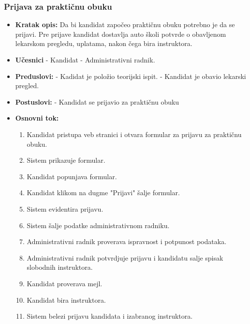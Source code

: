 \subsubsection{Prijava za praktičnu obuku}

\vspace{3mm}

\begin{itemize}

\item \textbf{Kratak opis:} Da bi kandidat započeo praktičnu obuku potrebno je da se prijavi. Pre prijave kandidat dostavlja auto školi potvrde o obavljenom lekarskom pregledu, uplatama, nakon čega bira instruktora.

\vspace{2mm}

\item \textbf{Učesnici} \newline
   - Kandidat \newline 
   - Administrativni radnik.

\item \textbf{Preduslovi:} \newline
   - Kadidat je položio teorijski ispit. \newline 
   - Kandidat je obavio lekarski pregled. 

\item \textbf{Postuslovi:} \newline
    - Kandidat se prijavio za praktičnu obuku 

\item \textbf{Osnovni tok:}  
   \begin{enumerate}
   \item Kandidat pristupa veb stranici i otvara formular za prijavu za praktičnu obuku.
   \item Sistem prikazuje formular.
   \item Kandidat popunjava formular.
   \item Kandidat klikom na dugme "Prijavi" šalje formular.
   \item Sistem evidentira prijavu.
   \item Sistem šalje podatke administrativnom radniku.
   \item Administrativni radnik proverava ispravnost i potpunost podataka.
   \item Administrativni radnik potvrdjuje prijavu i kandidatu salje spisak slobodnih instruktora.
   \item Kandidat proverava mejl.
   \item Kandidat bira instruktora.
   \item Sistem belezi prijavu kandidata i izabranog instruktora.
   \end{enumerate}


\end{itemize}
